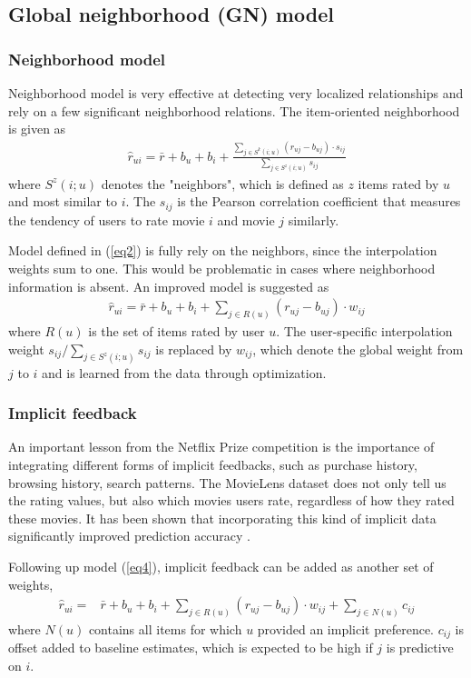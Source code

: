 \documentclass[journal]{IEEEtran}
\begin{document}
\subsection{Global neighborhood (GN) model}
\subsubsection{Neighborhood model}
Neighborhood model is very effective at detecting very localized relationships and rely on a few significant neighborhood relations. The item-oriented neighborhood \cite{item} is given as
\begin{align}
\label{eq3}
\hat{r}_{ui} = \bar{r} + b_u + b_i + \frac{\sum_{j \in S^k(i;u)} (r_{uj} - b_{uj}) \cdot s_{ij}}{\sum_{j \in S^z(i;u)} s_{ij}}
\end{align}
where $S^z(i;u)$ denotes the "neighbors", which is defined as $z$ items rated by $u$ and most similar to $i$. The $s_{ij}$ is the Pearson correlation coefficient that measures the tendency of users to rate movie $i$ and movie $j$ similarly.

Model defined in (\ref{eq2}) is fully rely on the neighbors, since the interpolation weights sum to one. This would be problematic in cases where neighborhood information is absent. An improved model \cite{koren} is suggested as
\begin{align}
\label{eq4}
\hat{r}_{ui} = \bar{r} + b_u + b_i + \sum_{j \in R(u)} (r_{uj} - b_{uj}) \cdot w_{ij}
\end{align}
where $R(u)$ is the set of items rated by user $u$. The user-specific interpolation weight ${s_{ij}}/{\sum_{j \in S^z(i;u)} s_{ij}}$ is replaced by $w_{ij}$, which denote the global weight from $j$ to $i$ and is learned from the data through optimization. 

\subsubsection{Implicit feedback} 
An important lesson from the Netflix Prize competition is the importance of integrating different forms of implicit feedbacks, such as purchase history, browsing history, search patterns\cite{lesson}. The MovieLens dataset does not only tell us the rating values, but also which movies users rate, regardless of how they rated these movies. It has been shown that incorporating this kind of implicit data significantly improved prediction accuracy \cite{koren}.

Following up model (\ref{eq4}), implicit feedback can be added as another set of weights,
\begin{align}
\label{eq5}
\hat{r}_{ui} = & \bar{r} + b_u + b_i + \sum_{j \in R(u)} (r_{uj} - b_{uj}) \cdot w_{ij}  + \sum_{j \in N(u)}  c_{ij}
\end{align}
where $N(u)$ contains all items for which $u$ provided an implicit preference. $c_{ij}$ is offset added to baseline estimates, which is expected to be high if $j$ is predictive on $i$.  
\end{document}
